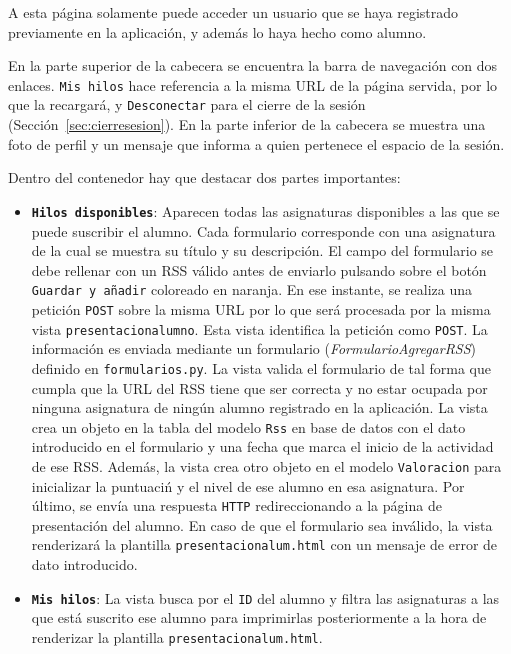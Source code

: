 \documentclass[a4paper, 12pt]{book}
\begin{document}
A esta p\'agina solamente puede acceder un usuario que se haya registrado previamente en la aplicaci\'on, y adem\'as lo haya hecho como alumno.

En la parte superior de la cabecera se encuentra la barra de navegaci\'on con dos enlaces. \texttt{Mis hilos} hace referencia a la misma URL de la 
p\'agina servida, por lo que la recargar\'a, y \texttt{Desconectar} para el cierre de la sesi\'on (Secci\'on~\ref{sec:cierresesion}). En la parte inferior 
de la cabecera se muestra una foto de perfil y un mensaje que informa a quien pertenece el espacio de la sesi\'on.

Dentro del contenedor hay que destacar dos partes importantes:
\begin{itemize}
  \item {\bfseries \texttt{Hilos disponibles}}: Aparecen todas las asignaturas disponibles a las que se puede suscribir el alumno. Cada formulario 
  corresponde con una asignatura de la cual se muestra su t\'itulo y su descripci\'on. El campo del formulario se debe rellenar con un RSS v\'alido antes 
  de enviarlo pulsando sobre el bot\'on \texttt{Guardar y a\~nadir} coloreado en naranja. En ese instante, se realiza una petici\'on 
  \texttt{POST} sobre la misma URL por lo que ser\'a procesada por la misma vista \texttt{presentacionalumno}. Esta vista identifica la petici\'on como 
  \texttt{POST}. La informaci\'on es enviada mediante un formulario (\textit{FormularioAgregarRSS}) definido en \texttt{formularios.py}. La vista valida 
  el formulario de tal forma que cumpla que la URL del RSS tiene que ser correcta y no estar ocupada por ninguna asignatura de ning\'un alumno registrado 
  en la aplicaci\'on. La vista crea un objeto en la tabla del modelo \texttt{Rss} en base de datos con el dato introducido en el formulario y una fecha que 
  marca el inicio de la actividad de ese RSS. Adem\'as, la vista crea otro objeto en el modelo \texttt{Valoracion} para inicializar la puntuaci\'n y el 
  nivel de ese alumno en esa asignatura. Por \'ultimo, se env\'ia una respuesta \texttt{HTTP} redireccionando a la p\'agina de presentaci\'on del alumno. 
  En caso de que el formulario sea inv\'alido, la vista renderizar\'a la plantilla \texttt{presentacionalum.html} con un mensaje de error de dato 
  introducido.
  \item {\bfseries \texttt{Mis hilos}}: La vista busca por el \texttt{ID} del alumno y filtra las asignaturas a las que est\'a suscrito ese alumno para 
  imprimirlas posteriormente a la hora de renderizar la plantilla \texttt{presentacionalum.html}.
\end{itemize}
\end{document}
